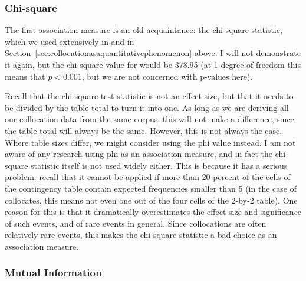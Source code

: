 \subsubsection{Chi-square}
\label{sec:amchisquare}

The first association  measure  is an old acquaintance: the chi-square  statistic, which we used extensively in  and in Section~\ref{sec:collocationasaquantitativephenomenon} above. I will not demonstrate it again, but the chi-square value for  would be 378.95 (at 1 degree of freedom this means that $p < 0.001$, but we are not concerned with p-values here).

Recall that the chi-square  test statistic is not an effect size,  but that it needs to be divided by the table total to turn it into one. As long as we are deriving all our collocation  data from the same corpus, this will not make a difference, since the table total will always be the same. However, this is not always the case. Where table sizes differ, we might consider using the phi value instead. I am not aware of any research using phi as an association  measure,  and in fact the chi-square  statistic itself is not used widely either. This is because it has a serious problem: recall that it cannot be applied if more than 20 percent of the cells of the contingency  table contain expected  frequencies smaller than 5 (in the case of collocates,  this means not even one out of the four cells of the 2-by-2 table). One reason for this is that it dramatically overestimates the effect size  and significance  of such events, and of rare events in general. Since collocations are often relatively rare events, this makes the chi-square  statistic a bad choice as an association   measure.

\subsubsection{Mutual Information}
\label{sec:ammutualinformation}

